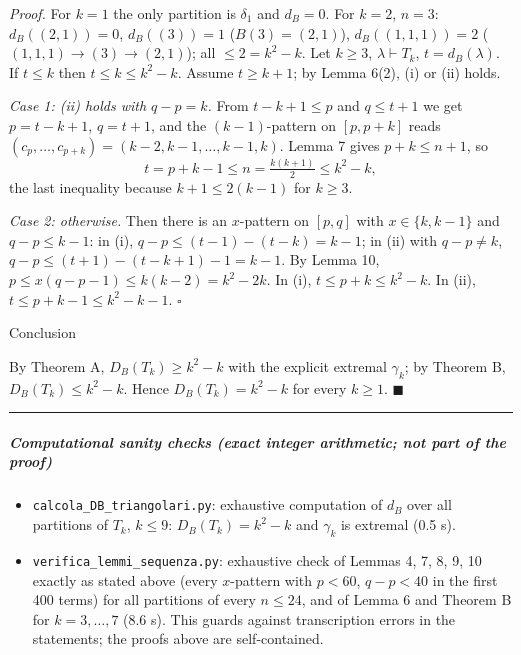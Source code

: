 \emph{Proof.} For \(k=1\) the only partition is \(\delta_1\) and
\(d_B=0\). For \(k=2\), \(n=3\): \(d_B((2,1))=0\), \(d_B((3))=1\)
(\(B(3)=(2,1)\)), \(d_B((1,1,1))=2\) (\((1,1,1)\to(3)\to(2,1)\)); all
\(\le2=k^2-k\). Let \(k\ge3\), \(\lambda\vdash T_k\),
\(t=d_B(\lambda)\). If \(t\le k\) then \(t\le k\le k^2-k\). Assume
\(t\ge k+1\); by Lemma 6(2), (i) or (ii) holds.

\emph{Case 1: (ii) holds with \(q-p=k\).} From \(t-k+1\le p\) and
\(q\le t+1\) we get \(p=t-k+1\), \(q=t+1\), and the \((k-1)\)-pattern on
\([p,p+k]\) reads \((c_p,\dots,c_{p+k})=(k-2,k-1,\dots,k-1,k)\). Lemma 7
gives \(p+k\le n+1\), so \[t=p+k-1\le n=\tfrac{k(k+1)}2\le k^2-k,\] the
last inequality because \(k+1\le 2(k-1)\) for \(k\ge3\).

\emph{Case 2: otherwise.} Then there is an \(x\)-pattern on \([p,q]\)
with \(x\in\{k,k-1\}\) and \(q-p\le k-1\): in (i),
\(q-p\le (t-1)-(t-k)=k-1\); in (ii) with \(q-p\ne k\),
\(q-p\le (t+1)-(t-k+1)-1=k-1\). By Lemma 10,
\(p\le x(q-p-1)\le k(k-2)=k^2-2k\). In (i), \(t\le p+k\le k^2-k\). In
(ii), \(t\le p+k-1\le k^2-k-1\). \(\square\)

Conclusion

By Theorem A, \(D_B(T_k)\ge k^2-k\) with the explicit extremal
\(\gamma_k\); by Theorem B, \(D_B(T_k)\le k^2-k\). Hence
\(D_B(T_k)=k^2-k\) for every \(k\ge1\). \(\blacksquare\)

\begin{center}\rule{0.5\linewidth}{0.5pt}\end{center}

\subparagraph{Computational sanity checks (exact integer arithmetic; not
part of the
proof)}\label{computational-sanity-checks-exact-integer-arithmetic-not-part-of-the-proof}

\begin{itemize}
\tightlist
\item
  \texttt{calcola\_DB\_triangolari.py}: exhaustive computation of
  \(d_B\) over all partitions of \(T_k\), \(k\le 9\): \(D_B(T_k)=k^2-k\)
  and \(\gamma_k\) is extremal (0.5 s).
\item
  \texttt{verifica\_lemmi\_sequenza.py}: exhaustive check of Lemmas 4,
  7, 8, 9, 10 exactly as stated above (every \(x\)-pattern with
  \(p<60\), \(q-p<40\) in the first 400 terms) for all partitions of
  every \(n\le24\), and of Lemma 6 and Theorem B for \(k=3,\dots,7\)
  (8.6 s). This guards against transcription errors in the statements;
  the proofs above are self-contained.
\end{itemize}


